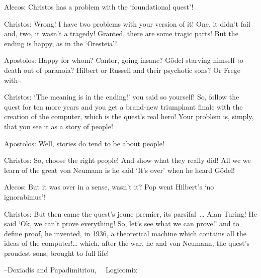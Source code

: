\newpage

{

\narrower\parindent=0pt
\baselineskip

{\it

Alecos: Christos has a problem with the `foundational quest'!

Christos:  Wrong!  I have two problems with your  {\rm {version}} of it!  One, it
didn't fail and, two, it wasn't a tragedy!  Granted, there are some tragic
parts!  But the ending is happy, as in the `Oresteia'!  

Apostolos:  Happy for whom?  Cantor, going insane?  G\"odel starving himself to
death out of paranoia? Hilbert or Russell and their psychotic sons? Or Frege with--

Christos: `The meaning
is in the ending!' you said so yourself!  So, follow the quest for ten more years and
you get a brand-new triumphant finale with the creation of the computer, which is the
quest's real hero!   Your problem is, simply, that you see it as a story of people!

Apostolos: Well, stories do tend to be about people!

Christos:  So, choose the right people!  And show what they really did!  All we we learn
of the great von Neumann is he said `It's over'  when he heard G\"odel!

Alecos: But it was over in a sense, wasn't it?  Pop went Hilbert's `no ignorabimus'!

Christos:  But then came the quest's jeune premier, its parsifal~\dots{}  Alan Turing!
He said `Ok, we can't prove everything! So, let's see what we can prove!' and to define
proof, he invented, in 1936, a theoretical machine which contains all the ideas of the
computer!\dots{}  which, after the war, he and von Neumann, the quest's proudest sons,
brought to full life!

{\hfill--Doxiadis and Papadimitriou, ~~Logicomix} %

}

}




\newpage

